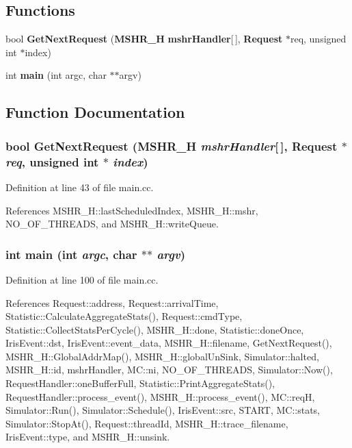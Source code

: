 \subsection*{Functions}
\begin{CompactItemize}
\item 
bool {\bf GetNextRequest} ({\bf MSHR\_\-H} {\bf mshrHandler}[$\,$], {\bf Request} $\ast$req, unsigned int $\ast$index)
\item 
int {\bf main} (int argc, char $\ast$$\ast$argv)
\end{CompactItemize}


\subsection{Function Documentation}
\subsubsection[{GetNextRequest}]{\setlength{\rightskip}{0pt plus 5cm}bool GetNextRequest ({\bf MSHR\_\-H} {\em mshrHandler}[$\,$], \/  {\bf Request} $\ast$ {\em req}, \/  unsigned int $\ast$ {\em index})}\label{main_8cc_3b0fd4edb104f5f9a3d5e25f3c554f06}




Definition at line 43 of file main.cc.

References MSHR\_\-H::lastScheduledIndex, MSHR\_\-H::mshr, NO\_\-OF\_\-THREADS, and MSHR\_\-H::writeQueue.
\subsubsection[{main}]{\setlength{\rightskip}{0pt plus 5cm}int main (int {\em argc}, \/  char $\ast$$\ast$ {\em argv})}\label{main_8cc_3c04138a5bfe5d72780bb7e82a18e627}




Definition at line 100 of file main.cc.

References Request::address, Request::arrivalTime, Statistic::CalculateAggregateStats(), Request::cmdType, Statistic::CollectStatsPerCycle(), MSHR\_\-H::done, Statistic::doneOnce, IrisEvent::dst, IrisEvent::event\_\-data, MSHR\_\-H::filename, GetNextRequest(), MSHR\_\-H::GlobalAddrMap(), MSHR\_\-H::globalUnSink, Simulator::halted, MSHR\_\-H::id, mshrHandler, MC::ni, NO\_\-OF\_\-THREADS, Simulator::Now(), RequestHandler::oneBufferFull, Statistic::PrintAggregateStats(), RequestHandler::process\_\-event(), MSHR\_\-H::process\_\-event(), MC::reqH, Simulator::Run(), Simulator::Schedule(), IrisEvent::src, START, MC::stats, Simulator::StopAt(), Request::threadId, MSHR\_\-H::trace\_\-filename, IrisEvent::type, and MSHR\_\-H::unsink.